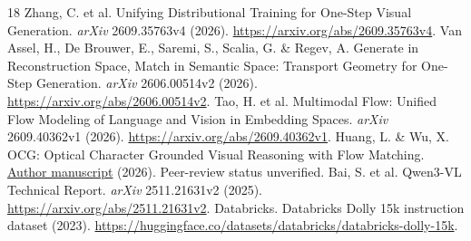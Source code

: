 \begin{thebibliography}{18}
 Zhang, C. et al. Unifying Distributional Training for One-Step Visual Generation. \emph{arXiv} 2609.35763v4 (2026). \url{https://arxiv.org/abs/2609.35763v4}.
 Van Assel, H., De Brouwer, E., Saremi, S., Scalia, G. \& Regev, A. Generate in Reconstruction Space, Match in Semantic Space: Transport Geometry for One-Step Generation. \emph{arXiv} 2606.00514v2 (2026). \url{https://arxiv.org/abs/2606.00514v2}.
 Tao, H. et al. Multimodal Flow: Unified Flow Modeling of Language and Vision in Embedding Spaces. \emph{arXiv} 2609.40362v1 (2026). \url{https://arxiv.org/abs/2609.40362v1}.
 Huang, L. \& Wu, X. OCG: Optical Character Grounded Visual Reasoning with Flow Matching. \href{https://www.alphaxiv.org/abs/2608.ocg-optical-character-grounded-reasoning}{Author manuscript} (2026). Peer-review status unverified.
 Bai, S. et al. Qwen3-VL Technical Report. \emph{arXiv} 2511.21631v2 (2025). \url{https://arxiv.org/abs/2511.21631v2}.
 Databricks. Databricks Dolly 15k instruction dataset (2023). \url{https://huggingface.co/datasets/databricks/databricks-dolly-15k}.
\end{thebibliography}
